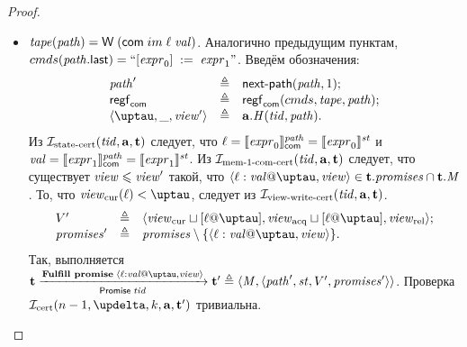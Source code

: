 \begin{proof}
\begin{itemize}
    \item $\mathit{tape}(\mathit{path}) = \textsf{W} \; (\mathsf{com} \; im \; \ell \; \mathit{val})$.
      Аналогично предыдущим пунктам, ${cmds}(\mathit{path}.\textup{\sf last}) = ``[\mathit{expr}_0]\;:=\;\mathit{expr}_1"$.
      Введём обозначения:
      \[\begin{array}{l l l}
        \cpath'    & \triangleq & \nextPath{\cpath}{1}; \\
        \regstcom  & \triangleq & \regstcom(\Cprom, \tape, \cpath); \\
        \angled{\tau, \_, \R'} & \triangleq & \aT.\hmap(\tId, \cpath). \\
      \end{array}\]
      Из $\mathcal{I}_{\textup{\rm state-cert}}(\mathit{tid}, \mathbf{a}, \mathbf{t})$ следует, что
      $\ell = \llbracket\mathit{expr}_0\rrbracket ^{\mathit{path}}_\mathsf{com} = \llbracket\mathit{expr}_0\rrbracket ^{\mathit{st}}$ и
      $\mathit{val} = \llbracket\mathit{expr}_1\rrbracket ^{\mathit{path}}_\mathsf{com} = \llbracket\mathit{expr}_1\rrbracket ^{\mathit{st}}$.
      Из $\mathcal{I}_{\textup{\rm mem-1-com-cert}}(\mathit{tid}, \mathbf{a}, \mathbf{t})$ следует, что существует 
      $\mathit{view} \leqslant \mathit{view}'$ такой, что $\writeEvt{\loc}{\stval}{\tau}{\R} \in \tT.\PromSet \cap \tT.\Mprom$.
      То, что $\Rcur(\loc) < \tau$, следует из $\mathcal{I}_{\textup{\rm view-write-cert}}(\mathit{tid}, \mathbf{a}, \mathbf{t})$.
      \[\begin{array}{l l l}
        \V' & \triangleq & \angled{\Rcur \sqcup [\loc @ \tau], \Racq \sqcup [\loc @ \tau], \Rrel}; \\
        \PromSet' & \triangleq & \PromSet \setminus \{\writeEvt{\loc}{\stval}{\tau}{\R}\}. \\
      \end{array}\]
      Так, выполняется $\tT \promTStepFulfillLoc \tT' \triangleq \angled{\Mprom, \angled{\cpath', \PromState, \V', \PromSet'}}$.
      Проверка $\invCert(n - 1, \delta, k, \aT, \tT')$ тривиальна.


\end{itemize}
\end{proof}
